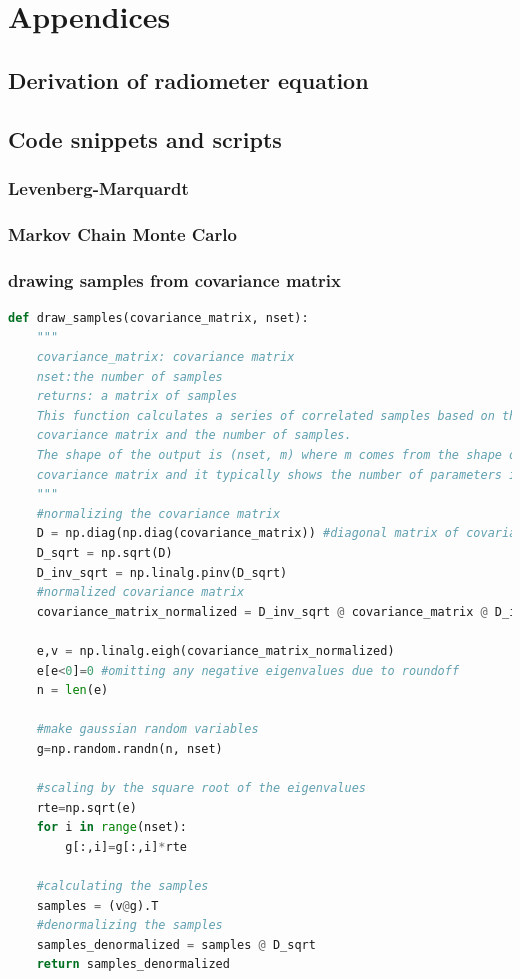 \documentclass[12pt, TexShade, letterpaper]{report}
\begin{document}
\chapter{Appendices}
\section{Derivation of radiometer equation}
\section{Code snippets and scripts}	
\subsection{Levenberg-Marquardt}
\label{chap:appendix,sub:LM}
\subsection{Markov Chain Monte Carlo}
\label{chap:appendix,sub:MCMC}
\subsection{drawing samples from covariance matrix}
\label{chap:appendix,sub:draw}
\begin{lstlisting}[language=Python, caption=Python example]
    def draw_samples(covariance_matrix, nset):
    """
    covariance_matrix: covariance matrix
    nset:the number of samples
    returns: a matrix of samples
    This function calculates a series of correlated samples based on the presented 
    covariance matrix and the number of samples.
    The shape of the output is (nset, m) where m comes from the shape of 
    covariance matrix and it typically shows the number of parameters in the model.
    """
    #normalizing the covariance matrix
    D = np.diag(np.diag(covariance_matrix)) #diagonal matrix of covariance matrix
    D_sqrt = np.sqrt(D)
    D_inv_sqrt = np.linalg.pinv(D_sqrt)
    #normalized covariance matrix
    covariance_matrix_normalized = D_inv_sqrt @ covariance_matrix @ D_inv_sqrt 

    e,v = np.linalg.eigh(covariance_matrix_normalized)
    e[e<0]=0 #omitting any negative eigenvalues due to roundoff
    n = len(e)

    #make gaussian random variables
    g=np.random.randn(n, nset)

    #scaling by the square root of the eigenvalues
    rte=np.sqrt(e)
    for i in range(nset):
        g[:,i]=g[:,i]*rte

    #calculating the samples
    samples = (v@g).T
    #denormalizing the samples
    samples_denormalized = samples @ D_sqrt
    return samples_denormalized
\end{lstlisting}
	{
	
	
	
	
	}
\end{document}
